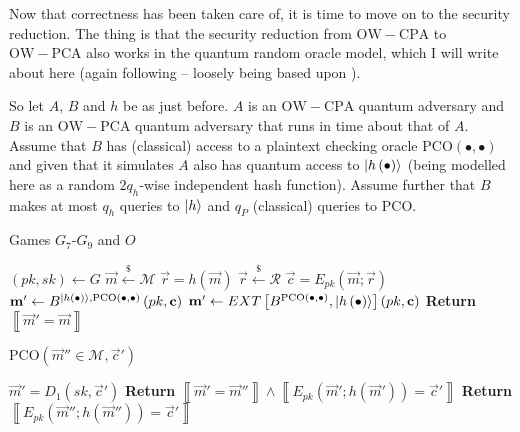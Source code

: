 Now that correctness has been taken care of, it is time to move on to the security reduction. The thing is that the security reduction from $\mathrm{OW-CPA}$ to $\mathrm{OW-PCA}$ also works in the quantum random oracle model, which I will write about here (again following \cite{HHK} -- loosely being based upon \cite{TU}).

So let $A$, $B$ and $h$ be as just before. $A$ is an $\mathrm{OW-CPA}$ quantum adversary and $B$ is an $\mathrm{OW-PCA}$ quantum adversary that runs in time about that of $A$. Assume that $B$ has (classical) access to a plaintext checking oracle $\mathrm{PCO}\left(\bullet, \bullet\right)$ and given that it simulates $A$ also has quantum access to $\lvert h\left(\bullet\right)\rangle$ (being modelled here as a random $2q_h$-wise independent hash function). Assume further that $B$ makes at most $q_h$ queries to $\lvert h\rangle$ and $q_P$ (classical) queries to $\mathrm{PCO}$.
%
\begin{center}
\begin{minipage}[ht!]{0.8\textwidth}
	\begin{algorithm}[H]
		\centering
		\caption{Games $G_7$-$G_9$ and $O$}
		\label{alg:G7toG9andO}
		\begin{algorithmic}
			\State $\left(pk,sk\right) \leftarrow G$
			\State $\vec{m} \xleftarrow{\$} \mathcal{M}$
			\State $\vec{r} = h\left(\vec{m}\right)$ 
			\State $\vec{r} \xleftarrow{\$} \mathcal{R}$ 
			\State $\vec{c} = E_{pk}\left( \vec{m}; \vec{r}\right)$
			\State $\boldsymbol{\mathrm{m}}' \leftarrow B^{\lvert h\left(\bullet\right)\rangle, \mathrm{PCO}\left(\bullet, \bullet\right)} \left(pk,\boldsymbol{\mathrm{c}}\right)$ 
			\State $\boldsymbol{\mathrm{m}}' \leftarrow EXT\left[ B^{\mathrm{PCO}\left(\bullet, \bullet\right)}, \lvert h\left(\bullet\right)\rangle\right] \left(pk, \boldsymbol{\mathrm{c}}\right)$ 
			\State \textbf{Return} $\left\llbracket \vec{m}' = \vec{m} \right\rrbracket$
		\end{algorithmic}
	\end{algorithm}
\end{minipage}
\end{center}
\begin{center}
\begin{minipage}[ht!]{0.8\textwidth}
	\begin{algorithm}[H]
		\centering
		\caption{$\mathrm{PCO}\left(\vec{m}'' \in \mathcal{M}, \vec{c}'\right)$}
		\label{alg:PCOFromP28InHHK}
		\begin{algorithmic}
			\State $\vec{m}' = D_1\left(sk, \vec{c}'\right)$ \Comment{$G_7$}
			\State \textbf{Return} $\left\llbracket \vec{m}' = \vec{m}'' \right\rrbracket \land \left\llbracket E_{pk}\left( \vec{m}'; h\left(\vec{m}'\right)\right) = \vec{c}' \right\rrbracket$ \Comment{$G_7$}
			\State \textbf{Return} $\left\llbracket E_{pk}\left( \vec{m}''; h\left(\vec{m}''\right)\right) = \vec{c}' \right\rrbracket$ \Comment{$G_8,G_9,O$}
		\end{algorithmic}
	\end{algorithm}
\end{minipage}
\end{center}
